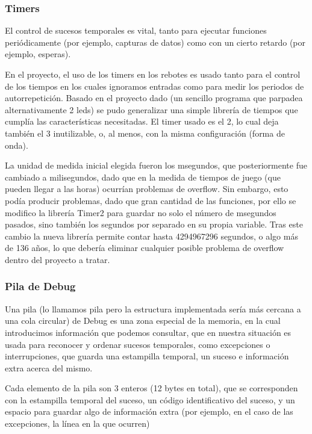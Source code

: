 \documentclass[12pt,letterpaper]{article}
\begin{document}
\subsubsection{Timers}
\label{subsubsec:timers}
El control de sucesos temporales es vital, tanto para ejecutar
funciones periódicamente (por ejemplo, capturas de datos) como con un
cierto retardo (por ejemplo, esperas).

En el proyecto, el uso de los timers en los rebotes es usado tanto
para el control de los tiempos en los cuales ignoramos entradas como
para medir los periodos de autorrepetición. Basado en el proyecto dado
(un sencillo programa que parpadea alternativamente 2 leds) se pudo
generalizar una simple librería de tiempos que cumplía las
características necesitadas. El timer usado es el 2, lo cual deja
también el 3 inutilizable, o, al menos, con la misma configuración
(forma de onda).

La unidad de medida inicial elegida fueron los \textgreek{m}segundos,
que posteriormente fue cambiado a milisegundos, dado que en la medida
de tiempos de juego (que pueden llegar a las horas) ocurrían problemas
de overflow. Sin embargo, esto podía producir problemas, dado que gran
cantidad de las funciones, por ello se modifico la librería Timer2
para guardar no solo el número de \textgreek{m}segundos pasados, sino
también los segundos por separado en su propia variable. Tras este
cambio la nueva librería permite contar hasta 4294967296 segundos, o
algo más de 136 años, lo que debería eliminar cualquier posible
problema de overflow dentro del proyecto a tratar.

\subsubsection{Pila de Debug}
\label{subsubsec:pila-debug}
Una pila (lo llamamos pila pero la estructura implementada sería más
cercana a una cola circular) de Debug es una zona especial de la
memoria, en la cual introducimos información que podemos consultar,
que en nuestra situación es usada para reconocer y ordenar sucesos
temporales, como excepciones o interrupciones, que guarda una
estampilla temporal, un suceso e información extra acerca del mismo.

Cada elemento de la pila son 3 enteros (12 bytes en total), que se
corresponden con la estampilla temporal del suceso, un código
identificativo del suceso, y un espacio para guardar algo de
información extra (por ejemplo, en el caso de las excepciones, la
línea en la que ocurren)
\end{document}
